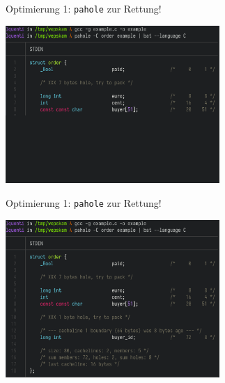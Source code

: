 \documentclass{beamer}
\begin{document}
%
%
\begin{frame}{Optimierung 1: \texttt{pahole} zur Rettung!}
\centerline{\includegraphics[height=6cm]{example4.png}}
\end{frame}

%
%
\begin{frame}{Optimierung 1: \texttt{pahole} zur Rettung!}
\centerline{\includegraphics[height=6cm]{example5.png}}
\end{frame}
\end{document}
